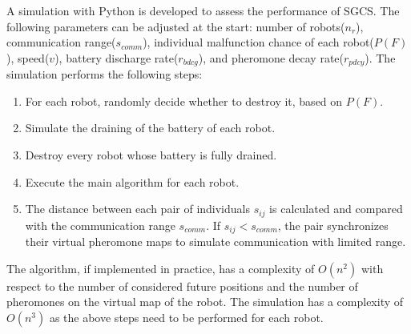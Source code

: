 A simulation with Python is developed to assess the performance of SGCS. The following parameters can be adjusted at the start: number of robots($n_r$), communication range($s_{comm}$), individual malfunction chance of each robot($P(F)$), speed($v$), battery discharge rate($r_{bdcg}$), and pheromone decay rate($r_{pdcy}$). 
The simulation performs the following steps:
\begin{enumerate}
	\item For each robot, randomly decide whether to destroy it, based on $P(F)$. 
	\item Simulate the draining of the battery of each robot.
	\item Destroy every robot whose battery is fully drained.
	\item Execute the main algorithm for each robot.
	\item The distance between each pair of individuals $s_{ij}$ is calculated and compared with the communication range $s_{comm}$. If $s_{ij}<s_{comm}$, the pair synchronizes their virtual pheromone maps to simulate communication with limited range.
\end{enumerate}
\par The algorithm, if implemented in practice, has a complexity of $O(n^2)$ with respect to the number of considered future positions and the number of pheromones on the virtual map of the robot. The simulation has a complexity of $O(n^3)$ as the above steps need to be performed for each robot.

